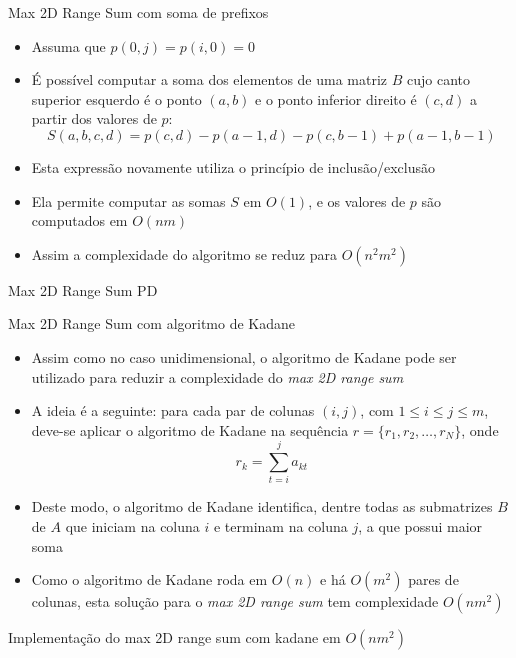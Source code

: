 \begin{frame}[fragile]{Max 2D Range Sum com soma de prefixos}

    \begin{itemize}
        \item Assuma que $p(0, j) = p(i, 0) = 0$

        \item É possível computar a soma dos elementos de uma matriz $B$ cujo canto superior
            esquerdo é o ponto $(a, b)$ e o ponto inferior direito é $(c, d)$ a partir dos
            valores de $p$:
        \[
            S(a, b, c, d) = p(c, d) - p(a - 1, d) - p(c, b - 1) + p(a - 1, b - 1)
        \]

        \item Esta expressão novamente utiliza o princípio de inclusão/exclusão

        \item Ela permite computar as somas $S$ em $O(1)$, e os valores de $p$ são computados em
            $O(nm)$

        \item Assim a complexidade do algoritmo se reduz para $O(n^2m^2)$

    \end{itemize}

\end{frame}



\begin{frame}[fragile]{Max 2D Range Sum PD}
\end{frame}

\begin{frame}[fragile]{Max 2D Range Sum com algoritmo de Kadane}

    \begin{itemize}
        \item Assim como no caso unidimensional, o algoritmo de Kadane pode ser utilizado para
            reduzir a complexidade do \textit{max 2D range sum}

        \item A ideia é a seguinte: para cada par de colunas $(i, j)$, com $1\leq i\leq j \leq m$,
            deve-se aplicar o algoritmo de Kadane na sequência $r = \{ r_1, r_2, \ldots, r_N \} $,
            onde
            \[
                r_k = \sum_{t = i}^j a_{kt}
            \]

        \item Deste modo, o algoritmo de Kadane identifica, dentre todas as submatrizes $B$ de $A$
            que iniciam na coluna $i$ e terminam na coluna $j$, a que possui maior soma

        \item Como o algoritmo de Kadane roda em $O(n)$ e há $O(m^2)$ pares de colunas, 
            esta solução para o \textit{max 2D range sum} tem complexidade $O(nm^2)$
    \end{itemize}

\end{frame}

\begin{frame}[fragile]{Implementação do max 2D range sum com kadane em $O(nm^2)$}
\end{frame}
